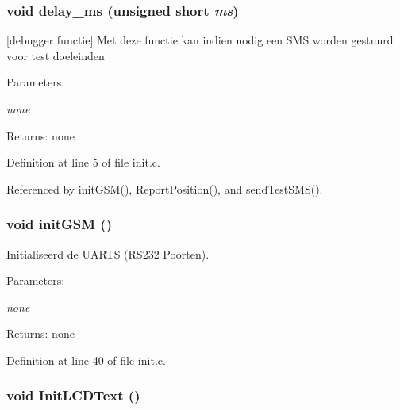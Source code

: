 \subsubsection{\setlength{\rightskip}{0pt plus 5cm}void delay\_\-ms (unsigned short {\em ms})}\label{init_8c_a1ba68fc7ab966105fae607da326be4c}


[debugger functie] Met deze functie kan indien nodig een SMS worden gestuurd voor test doeleinden 

\begin{Desc}
\item[Parameters:]
\begin{description}
\item[{\em none}]\end{description}
\end{Desc}
\begin{Desc}
\item[Returns:]none \end{Desc}


Definition at line 5 of file init.c.

Referenced by initGSM(), ReportPosition(), and sendTestSMS().
\subsubsection{\setlength{\rightskip}{0pt plus 5cm}void initGSM ()}\label{init_8c_4e89a007463e590994ce3fe3dc12df1d}


Initialiseerd de UARTS (RS232 Poorten). 

\begin{Desc}
\item[Parameters:]
\begin{description}
\item[{\em none}]\end{description}
\end{Desc}
\begin{Desc}
\item[Returns:]none \end{Desc}


Definition at line 40 of file init.c.
\subsubsection{\setlength{\rightskip}{0pt plus 5cm}void InitLCDText ()}\label{init_8c_ecc62df77a68ab3ee7b939ff7bb1a881}




